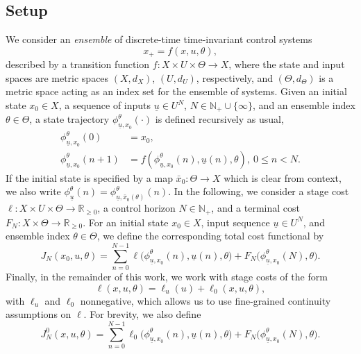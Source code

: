 \documentclass[letterpaper, 10 pt, conference]{IEEEconf}  %
\newcommand{\Rnn}{\mathbb{R}_{\geq 0}} %
\newcommand{\Np}{\mathbb{N}_+} %
\newcommand{\s}{\phi} %
\newcommand{\es}{\bar{x}} %
\newcommand{\is}[1]{{\underline{#1}}} %
\theoremstyle{theorem}
\theoremstyle{definition}
\theoremstyle{remark}
\begin{document}
\subsection{Setup}
We consider an \emph{ensemble} of discrete-time time-invariant control systems 
\begin{equation} \label{eq:system}
    x_+ = f(x,u,\theta),
\end{equation}
described by a transition function $f \colon X \times U \times \Theta \rightarrow X$,
where the state and input spaces are metric spaces $(X,d_X)$, $(U,d_U)$, respectively,
and $(\Theta,d_\Theta)$ is a metric space acting as an index set for the ensemble of systems.
Given an initial state $x_0\in X$, a sequence of inputs $\is{u}\in U^N$, $N\in\Np \cup\{\infty\}$, and an ensemble index $\theta\in\Theta$,
a state trajectory $\s_{\is{u},x_0}^\theta(\cdot)$ is defined recursively as usual,
\begin{align*}
    \s_{\is{u},x_0}^\theta(0) & = x_0, \\
     \s_{\is{u},x_0}^\theta(n+1) & = f(\s_{\is{u},x_0}^\theta(n),\is{u}(n),\theta), \: 0 \leq n < N.
\end{align*}
If the initial state is specified by a map $\es_0 \colon \Theta \rightarrow X$ which is clear from context,
we also write $\s_\is{u}^\theta(n) = \s_{\is{u},\es_0(\theta)}^\theta(n)$.
In the following, we consider a stage cost $\ell \colon X \times U \times \Theta \rightarrow \Rnn$, a control horizon $N\in\Np$, and a terminal cost $F_N \colon X\times\Theta\rightarrow\Rnn$.
For an initial state $x_0\in X$, input sequence $\is{u}\in U^N$, and ensemble index $\theta\in\Theta$, we define the corresponding total cost functional by
\begin{equation} \label{eq:dteoc:totalCostFunctional}
    J_N(x_0,u,\theta) = \sum_{n=0}^{N-1} \ell \big( \s_{\is{u},x_0}^\theta(n), \is{u}(n), \theta \big) + F_N\big( \s_{\is{u},x_0}^\theta(N), \theta \big).
\end{equation}
Finally, in the remainder of this work, we work with stage costs of the form
\begin{equation} \label{eq:dteoc:ecc:formOfEll}
    \ell(x,u,\theta)=\ell_u(u) + \ell_0(x,u,\theta),
\end{equation}
with $\ell_u$ and $\ell_0$ nonnegative, which allows us to use fine-grained continuity assumptions on $\ell$.
For brevity, we also define
\begin{equation*}
     J_N^0(x,u,\theta) = \sum_{n=0}^{N-1} \ell_0 \big( \s_{\is{u},x_0}^\theta(n), \is{u}(n), \theta \big) + F_N\big( \s_{\is{u},x_0}^\theta(N), \theta \big).
\end{equation*}
\end{document}
